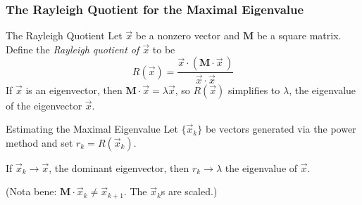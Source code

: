\documentclass[10pt,handout,hyperref={colorlinks=true,linkcolor=blue,citecolor=citelink,urlcolor=gray}]{beamer}
\newcounter{e_temp}
\begin{document}
\begin{frame}[label=Rayleigh]
\frametitle{The Rayleigh Quotient for the Maximal Eigenvalue}
\begin{block}{The Rayleigh Quotient\footnotemark}
Let $\vec{x}$ be a nonzero vector and $\mathbf{M}$ be a square matrix. Define the \emph{Rayleigh quotient of $\vec{x}$} to be
\[	R(\vec{x}) = \frac{\vec{x} \cdot (\mathbf{M}\cdot\vec{x}\,)}{\vec{x}\cdot\vec{x}}	\]
If $\vec{x}$ is an eigenvector, then $\mathbf{M}\cdot\vec{x} = \lambda\vec{x}$, so $R(\vec{x})$ simplifies to $\lambda$, the eigenvalue of the eigenvector $\vec{x}$. 
\end{block}
\vfill

\begin{block}{Estimating the Maximal Eigenvalue}
Let $\{\vec{x}_k\}$ be vectors generated via the power method and set $r_k=R(\vec{x}_k)$.
\vspace{1ex}

If $\vec{x}_k \to \vec{x}$, the dominant eigenvector, then $r_k\to \lambda$ the eigenvalue of $\vec{x}$.
\vspace{2ex}

{\footnotesize (Nota bene: $\mathbf{M}\cdot\vec{x}_k \ne \vec{x}_{k+1}$. The $\vec{x}_{k}$s are scaled.)}
\end{block}
\vfill
{}
\end{frame}


\end{document}

